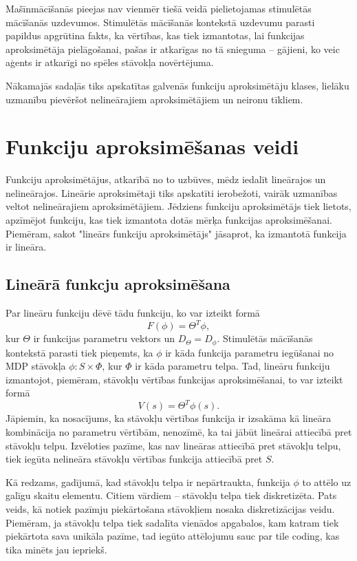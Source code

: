 \documentclass{ludis} %
\begin{document}
Mašīnmācīšanās pieejas nav vienmēr tiešā veidā pielietojamas stimulētās mācīšanās uzdevumos.
Stimulētās mācīšanās kontekstā uzdevumu parasti papildus apgrūtina fakts, ka vērtības, kas tiek izmantotas, lai funkcijas aproksimētāja pielāgošanai, pašas ir atkarīgas no tā snieguma -- gājieni, ko veic aģents ir atkarīgi no spēles stāvokļa novērtējuma.

Nākamajās sadaļās tiks apskatītas galvenās funkciju aproksimētāju klases, lielāku uzmanību pievēršot nelineārajiem aproksimētājiem un neironu tīkliem.

\section{Funkciju aproksimēšanas veidi}
Funkciju aproksimētājus, atkarībā no to uzbūves, mēdz iedalīt lineārajos un nelineārajos. Lineārie aproksimētaji tiks apskatīti ierobežoti, vairāk uzmanības veltot nelineārajiem aproksimētājiem.
Jēdziens funkciju aproksimētājs tiek lietots, apzīmējot funkciju, kas tiek izmantota dotās mērķa funkcijas aproksimēšanai.
Piemēram, sakot "lineārs funkciju aproksimētājs" jāsaprot, ka izmantotā funkcija ir lineāra.

\subsection{Lineārā funkcju aproksimēšana}
Par lineāru funkciju dēvē tādu funkciju, ko var izteikt formā
\[
	F(\phi) = \Theta^T \phi,
\]
kur $\Theta$ ir funkcijas parametru vektors un $D_\Theta = D_\phi$. %
Stimulētās mācīšanās kontekstā parasti tiek pieņemts, ka $\phi$ ir kāda funkcija parametru iegūšanai no MDP stāvokļa $\phi : S \times \Phi$, kur $\Phi$ ir kāda parametru telpa.
Tad, lineāru funkciju izmantojot, piemēram, stāvokļu vērtības funkcijas aproksimēšanai, to var izteikt formā
\[
	V(s) = \Theta^T \phi(s).
\]
Jāpiemin, ka nosacījums, ka stāvokļu vērtības funkcija ir izsakāma kā lineāra kombinācija no parametru vērtībām, nenozīmē, ka tai jābūt lineārai attiecībā pret stāvokļu telpu.
Izvēloties pazīme, kas nav lineāras attiecībā pret stāvokļu telpu, tiek iegūta nelineāra stāvokļu vērtības funkcija attiecībā pret $S$.

Kā redzams, gadījumā, kad stāvokļu telpa ir nepārtraukta, funkcija $\phi$ to attēlo uz galīgu skaitu elementu.
Citiem vārdiem -- stāvokļu telpa tiek diskretizēta.
Pats veids, kā notiek pazīmju piekārtošana stāvokļiem nosaka diskretizācijas veidu.
Piemēram, ja stāvokļu telpa tiek sadalīta vienādos apgabalos, kam katram tiek piekārtota sava unikāla pazīme, tad iegūto attēlojumu sauc par tile coding, kas tika minēts jau iepriekš.
\end{document}
